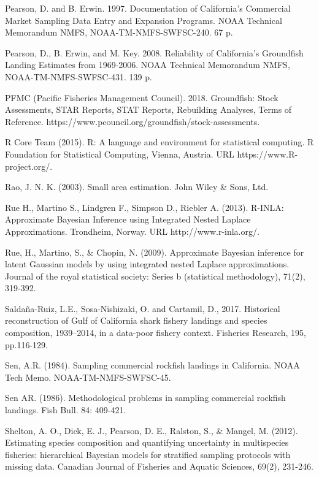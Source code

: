 \documentclass[12pt]{article}
\begin{document}
\begin{thebibliography}{1}
%
 Pearson, D. and B. Erwin. 1997. Documentation of 
California's Commercial Market Sampling Data Entry and Expansion Programs. 
NOAA Technical Memorandum NMFS, NOAA-TM-NMFS-SWFSC-240. 67 p.

%
Pearson, D., B. Erwin, and M. Key. 2008. Reliability 
of California's Groundfish Landing Estimates from 1969-2006. NOAA Technical 
Memorandum NMFS, NOAA-TM-NMFS-SWFSC-431. 139 p.

%
 PFMC (Pacific Fisheries Management Council). 2018. 
Groundfish: Stock Assessments, STAR Reports, STAT Reports, Rebuilding 
Analyses, Terms of Reference. https://www.pcouncil.org/groundfish/stock-assessments.

%
 R Core Team (2015). R: A language and environment for 
statistical computing. R Foundation for Statistical Computing, Vienna, 
Austria. URL https://www.R-project.org/.

%
 Rao, J. N. K. (2003). Small area estimation. John Wiley \& Sons, Ltd.

%
 Rue H., Martino S., Lindgren F., Simpson D., Riebler A. 
(2013). R-INLA: Approximate Bayesian Inference using Integrated Nested Laplace 
Approximations.  Trondheim, Norway. URL 
http://www.r-inla.org/.

%
 Rue, H., Martino, S., \& Chopin, N. (2009). Approximate 
Bayesian inference for latent Gaussian models by using integrated nested 
Laplace approximations. Journal of the royal statistical society: 
Series b (statistical methodology), 71(2), 319-392.

%
 Saldaña-Ruiz, L.E., Sosa-Nishizaki, O. and Cartamil, D., 
2017. Historical reconstruction of Gulf of California shark fishery landings 
and species composition, 1939–2014, in a data-poor fishery context. Fisheries 
Research, 195, pp.116-129.

%
 Sen, A.R. (1984). Sampling commercial rockfish landings in 
California. NOAA Tech Memo. NOAA-TM-NMFS-SWFSC-45.

%
 Sen AR. (1986). Methodological problems in sampling 
commercial rockfish landings. Fish Bull. 84: 409-421.

%
 Shelton, A. O., Dick, E. J., Pearson, D. E., Ralston, 
S., \& Mangel, M. (2012). Estimating species composition and quantifying 
uncertainty in multispecies fisheries: hierarchical Bayesian models for 
stratified sampling protocols with missing data. Canadian Journal of Fisheries 
and Aquatic Sciences, 69(2), 231-246.


\end{thebibliography}
\end{document}

